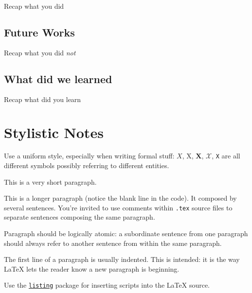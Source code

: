 \documentclass{scrartcl}
\begin{document}
Recap what you did

\subsection{Future Works}\label{subsec:future-works}

Recap what you did \emph{not}

\subsection{What did we learned}\label{subsec:what-did-we-learned}

Recap what did you learn

\section*{Stylistic Notes}

Use a uniform style, especially when writing formal stuff: $X$, X, $\mathbf{X}$, $\mathcal{X}$, \texttt{X} are all different symbols possibly referring to different entities.

This is a very short paragraph.

This is a longer paragraph (notice the blank line in the code).
It composed by several sentences.
%
You're invited to use comments within \texttt{.tex} source files to separate sentences composing the same paragraph.

Paragraph should be logically atomic: a subordinate sentence from one paragraph should always refer to another sentence from within the same paragraph.

The first line of a paragraph is usually indented.
%
This is intended: it is the way \LaTeX{} lets the reader know a new paragraph is beginning.

Use the \href{https://en.wikibooks.org/wiki/LaTeX/Source_Code_Listings}{\texttt{listing}} package for inserting scripts into the \LaTeX{} source.

\nocite{*} %


\end{document}

